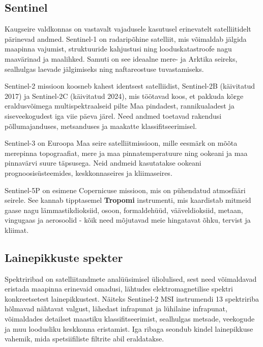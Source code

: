 \subsection{Sentinel}
Kaugseire valdkonnas on vastavalt vajadusele kasutusel erinevatelt satelliitidelt pärinevad andmed. Sentinel-1 on radaripõhine satelliit, mis võimaldab jälgida maapinna vajumist,
struktuuride kahjustusi ning looduskatastroofe nagu maavärinad ja maalihked. Samuti on
see ideaalne mere- ja Arktika seireks, sealhulgas laevade jälgimiseks ning
naftareostuse tuvastamiseks. \cite{S1Applications}

Sentinel-2 missioon koosneb kahest identsest satelliidist, Sentinel-2B
(käivitatud 2017) ja Sentinel-2C (käivitatud 2024), mis töötavad koos, et
pakkuda kõrge eraldusvõimega multispektraalseid pilte Maa pindadest,
rannikualadest ja siseveekogudest iga viie päeva järel. Need andmed toetavad
rakendusi põllumajanduses, metsanduses ja maakatte klassifitseerimisel. \cite{S2Applications}

Sentinel-3 on Euroopa Maa seire satelliitmissioon, mille eesmärk on mõõta
merepinna topograafiat, mere ja maa pinnatemperatuure ning ookeani ja maa
pinnavärvi suure täpsusega. Neid andmeid kasutatakse ookeani prognoosisüsteemides,
keskkonnaseires ja kliimaseires. \cite{S3Mission}

Sentinel-5P on esimene Copernicuse missioon, mis on pühendatud atmosfääri
seirele. See kannab tipptasemel \textbf{Tropomi} instrumenti, mis kaardistab mitmeid
gaase nagu lämmastikdioksiid, osoon, formaldehüüd, vääveldioksiid, metaan,
vingugaas ja aerosoolid - kõik need mõjutavad meie hingatavat õhku, tervist ja
kliimat. \cite{S5PApplications}
\subsection{Lainepikkuste spekter}
Spektriribad on satelliitandmete analüüsimisel üliolulised, sest need
võimaldavad eristada maapinna erinevaid omadusi, lähtudes elektromagnetilise
spektri konkreetsetest lainepikkustest. Näiteks Sentinel-2 MSI instrumendi 13
spektririba hõlmavad nähtavat valgust, lähedast infrapunat ja lühilaine
infrapunat, võimaldades detailset maastiku klassifitseerimist, sealhulgas
metsade, veekogude ja muu loodusliku keskkonna eristamist. Iga ribaga seondub
kindel lainepikkuse vahemik, mida spetsiifiliste filtrite abil eraldatakse. \cite{S2Mission}
\bigskip


